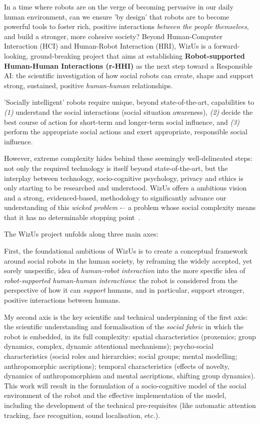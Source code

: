 \documentclass[11pt]{article}
\newcommand{\project}{WizUs\xspace}
\begin{document}
In a time where robots are on the verge of becoming pervasive in our daily human
environment, can we ensure 'by design' that robots are to become powerful tools
to foster rich, positive interactions \emph{between the people themselves}, and
build a stronger, more cohesive society? Beyond Human-Computer Interaction (HCI)
and Human-Robot Interaction (HRI), \project is a forward-looking,
ground-breaking project that aims at establishing \textbf{Robot-supported
Human-Human Interactions (r-HHI)} as the next step toward a Responsible AI: the
scientific investigation of how social robots can create, shape and support
strong, sustained, positive \emph{human-human} relationships.

'Socially intelligent' robots require unique, beyond state-of-the-art,
capabilities to \emph{(1)} understand the social interactions (social
situation awareness), \emph{(2)} decide the best course of action for
short-term and longer-term social influence, and \emph{(3)} perform the
appropriate social actions and exert appropriate, responsible social influence.

However, extreme complexity hides behind these seemingly well-delineated steps:
not only the required technology is itself beyond state-of-the-art, but the
interplay between technology, socio-cognitive psychology, privacy and ethics is
only starting to be researched and understood. \project offers a ambitious
vision and a strong, evidenced-based, methodology to significantly advance our
understanding of this \emph{wicked problem} -– a problem whose social complexity
means that it has no determinable stopping point~\cite{tonkinwise2015design}.

The \project project unfolds along three main axes:

First, the foundational ambitious of \project is to create a conceptual
framework around social robots in the human society, by reframing the widely
accepted, yet sorely unspecific, idea of \emph{human-robot interaction} into the
more specific idea of \emph{robot-supported human-human interactions}: the robot
is considered from the perspective of how it can \emph{support} humans, and in
particular, support stronger, positive interactions between humans.

My second axis is the key scientific and technical underpinning of the first
axis:  the scientific understanding and formalisation of the \emph{social
fabric} in which the robot is embedded, in its full complexity: spatial
characteristics (proxemics; group dynamics, complex, dynamic attentional
mechanisms); psycho-social characteristics (social roles and hierarchies; social
groups; mental modelling; anthropomorphic ascriptions); temporal characteristics
(effects of novelty, dynamics of anthropomorphism and mental ascriptions,
shifting group dynamics). This work will result in the formulation of a
socio-cognitive model of the social environment of the robot and the effective
implementation of the model, including the development of the technical
pre-requisites (like automatic attention tracking, face recognition, sound
localisation, etc.).
\end{document}
